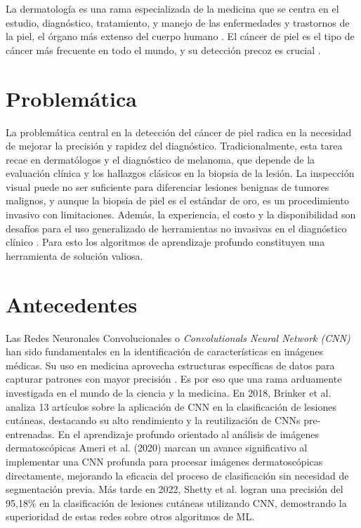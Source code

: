 La dermatología es una rama especializada de la medicina que se centra en el estudio, diagnóstico, tratamiento, y manejo de las enfermedades y trastornos de la piel, el órgano más extenso del cuerpo humano . El cáncer de piel es el tipo de cáncer más frecuente en todo el mundo, y su detección precoz es crucial .

\section*{Problemática}

La problemática central en la detección del cáncer de piel radica en la necesidad de mejorar la precisión y rapidez del diagnóstico. Tradicionalmente, esta tarea recae en dermatólogos y el diagnóstico de melanoma, que depende de la evaluación clínica y los hallazgos clásicos en la biopsia de la lesión. La inspección visual puede no ser suficiente para diferenciar lesiones benignas de tumores malignos, y aunque la biopsia de piel es el estándar de oro, es un procedimiento invasivo con limitaciones. Además, la experiencia, el costo y la disponibilidad son desafíos para el uso generalizado de herramientas no invasivas en el diagnóstico clínico . Para esto los algoritmos de aprendizaje profundo constituyen una herramienta de solución valiosa.

\section*{Antecedentes}

Las Redes Neuronales Convolucionales o \textit{Convolutionals Neural Network (CNN)} han sido fundamentales en la identificación de características en imágenes médicas. Su uso en medicina aprovecha estructuras específicas de datos para capturar patrones con mayor precisión . Es por eso que una rama arduamente investigada en el mundo de la ciencia y la medicina. En 2018, Brinker et al.  analiza 13 artículos sobre la aplicación de CNN en la clasificación de lesiones cutáneas, destacando su alto rendimiento y la reutilización de CNNs pre-entrenadas. En el aprendizaje profundo orientado al análisis de imágenes dermatoscópicas Ameri et al. (2020)  marcan un avance significativo al implementar una CNN profunda para procesar imágenes dermatoscópicas directamente, mejorando la eficacia del proceso de clasificación sin necesidad de segmentación previa. Más tarde en 2022, Shetty et al.  logran una precisión del 95,18\% en la clasificación de lesiones cutáneas utilizando CNN, demostrando la superioridad de estas redes sobre otros algoritmos de ML.

